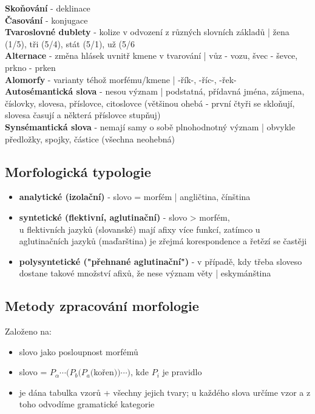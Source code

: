 \documentclass[a4paper]{article}
\newcommand{\imwb}[2]{\textbf{#1} - #2 \\}
\newcommand{\imwc}[2]{\textbf{#1} - #2}
\begin{document}
\imwb{Skoňování}{deklinace}
\imwb{Časování}{konjugace}
\imwb{Tvaroslovné dublety}{kolize v odvození z různých slovních základů | žena (1/5), tři (5/4), stát (5/1), už (5/6}
\imwb{Alternace}{změna hlásek uvnitř kmene v tvarování | vůz - vozu, švec - ševce, prkno - prken}
\imwb{Alomorfy}{varianty téhož morfému/kmene | -řík-, -říc-, -řek-}
\imwb{Autosémantická slova}{nesou význam | podstatná, přídavná jména, zájmena, číslovky, slovesa, příslovce, citoslovce (většinou ohebá - první čtyři se skloňují, slovesa časují a některá příslovce stupňuj)}
\imwb{Synsémantická slova}{nemají samy o sobě plnohodnotný význam | obvykle předložky, spojky, částice (všechna neohebná) }

\subsection*{Morfologická typologie}
\begin{itemize}
\item \imwc{analytické (izolační)}{slovo = morfém | angličtina, čínština} 
\item \imwc{syntetické (flektivní, aglutinační)}{slovo > morfém, }  \\
u flektivních jazyků (slovanské) mají afixy více funkcí, zatímco u aglutinačních jazyků (maďarština) je zřejmá korespondence a řetězí se častěji
\item \imwc{polysyntetické ("přehnané aglutinační")}{v případě, kdy třeba sloveso dostane takové množství afixů, že nese význam věty | eskymánština } 
\end{itemize}
	
	
\subsection*{Metody zpracování morfologie}
Založeno na:
\begin{itemize}
\item slovo jako posloupnost morfémů
\item slovo = $P_\alpha \cdots (P_b(P_a($kořen$))\cdots)$, kde $P_i$ je pravidlo
\item je dána tabulka vzorů + všechny jejich tvary; u každého slova určíme vzor a z toho odvodíme gramatické kategorie
\end{itemize}
\end{document}
